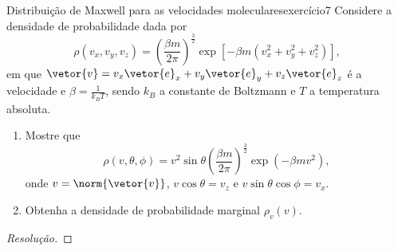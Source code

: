 \begin{exercício}{Distribuição de Maxwell para as velocidades moleculares}{exercício7}
    Considere a densidade de probabilidade dada por
    \begin{equation*}
        \rho(v_x,v_y,v_z) = \left(\frac{\beta m}{2\pi}\right)^{\frac32}\exp\left[-\beta m \left(v_x^2 + v_y^2 + v_z^2\right)\right],
    \end{equation*}
    em que \(\vetor{v} = v_x\vetor{e}_x+v_y\vetor{e}_y+v_z\vetor{e}_z\) é a velocidade e \(\beta = \frac{1}{k_BT}\), sendo \(k_B\) a constante de Boltzmann e \(T\) a temperatura absoluta.
    \begin{enumerate}[label=(\alph*)]
        \item Mostre que
            \begin{equation*}
                \rho(v, \theta, \phi) = v^2 \sin\theta\left(\frac{\beta m}{2\pi}\right)^{\frac32}\exp\left(-\beta m v^2\right),
            \end{equation*}
            onde \(v = \norm{\vetor{v}}\), \(v\cos\theta = v_z\) e \(v\sin\theta\cos\phi = v_x\).
        \item Obtenha a densidade de probabilidade marginal \(\rho_v(v)\).
    \end{enumerate}
\end{exercício}
\begin{proof}[Resolução]

\end{proof}

